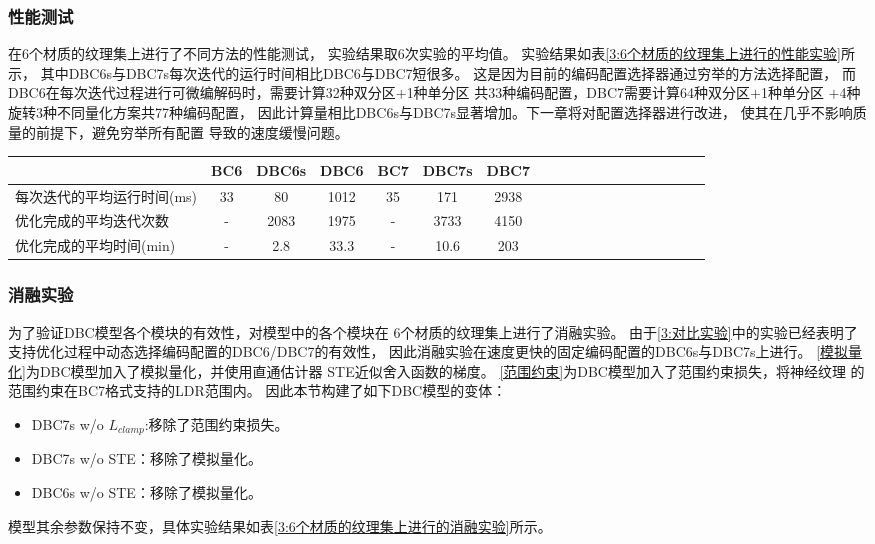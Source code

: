 \subsubsection{性能测试}
\label{3:性能测试}
在6个材质的纹理集上进行了不同方法的性能测试，
实验结果取6次实验的平均值。
实验结果如表\ref{3:6个材质的纹理集上进行的性能实验}所示，
其中DBC6s与DBC7s每次迭代的运行时间相比DBC6与DBC7短很多。
这是因为目前的编码配置选择器通过穷举的方法选择配置，
而DBC6在每次迭代过程进行可微编解码时，需要计算32种双分区$+$1种单分区
共33种编码配置，DBC7需要计算64种双分区$+$1种单分区
$+$4种旋转\times3种不同量化方案共77种编码配置，
因此计算量相比DBC6s与DBC7s显著增加。下一章将对配置选择器进行改进，
使其在几乎不影响质量的前提下，避免穷举所有配置
导致的速度缓慢问题。

\begin{table*}[htbp]
    \centering
    \caption{6个材质的纹理集上进行的性能实验}
    \label{3:6个材质的纹理集上进行的性能实验}        
    \begin{tabular}{lcccccccccccccccccc}
        \toprule
                                    & BC6 & DBC6s & DBC6 & BC7  & DBC7s & DBC7 \\
        \midrule
        每次迭代的平均运行时间(ms)  & 33  &  80    & 1012 & 35   & 171   &  2938 \\
        优化完成的平均迭代次数      & -   &  2083  & 1975 & -   & 3733   & 4150  \\
        优化完成的平均时间(min)     & -   &  2.8  & 33.3 & -   & 10.6   &   203\\
        \bottomrule
\end{tabular} %
\end{table*}

\subsubsection{消融实验}

为了验证DBC模型各个模块的有效性，对模型中的各个模块在
6个材质的纹理集上进行了消融实验。
由于\ref{3:对比实验}中的实验已经表明了支持优化过程中动态选择编码配置的DBC6/DBC7的有效性，
因此消融实验在速度更快的固定编码配置的DBC6s与DBC7s上进行。
\ref{模拟量化}为DBC模型加入了模拟量化，并使用直通估计器
STE\cite{bengio2013estimating}近似舍入函数的梯度。
\ref{范围约束}为DBC模型加入了范围约束损失，将神经纹理
的范围约束在BC7格式支持的LDR范围内。
因此本节构建了如下DBC模型的变体：
\begin{itemize}
    \item DBC7s w/o $L_{clamp}$:移除了范围约束损失。
    \item DBC7s w/o STE：移除了模拟量化。
    \item DBC6s w/o STE：移除了模拟量化。
\end{itemize}
模型其余参数保持不变，具体实验结果如表\ref{3:6个材质的纹理集上进行的消融实验}所示。

